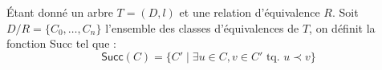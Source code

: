 
\begin{definition}
    \label{def:struct:quotient:succ}
    Étant donné un arbre $T = (D, l)$ et une relation d'équivalence $R$.
    Soit $D/R = \{C_0, \dots, C_n\}$ l'ensemble des classes d'équivalences de $T$, on définit la fonction \textsf{Succ} tel que :
    \begin{equation}
        \textsf{Succ}(C) = \{ C' \mid \exists u \in C, v \in C' \text{ tq. } u \prec v \}
    \end{equation}
\end{definition}

